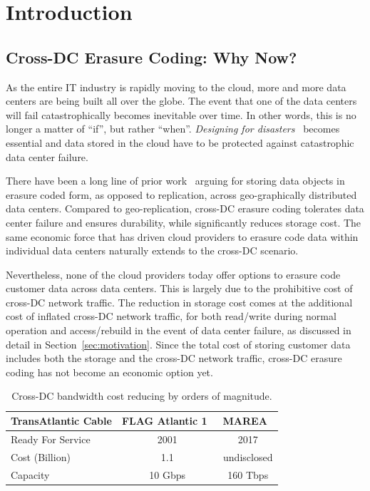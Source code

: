 \section{Introduction}

\subsection{Cross-DC Erasure Coding: Why Now?}

As the entire IT industry is rapidly moving to the cloud, more and more data
centers are being built all over the globe. The event that one of the data
centers will fail catastrophically becomes inevitable over time. In other words,
this is no longer a matter of ``if'', but rather ``when''. {\em Designing for
  disasters}~\cite{keeton04designing} becomes essential and data stored in the
cloud have to be protected against catastrophic data center failure.

There have been a long line of prior work~\cite{oceanstore:asplos00,
  pond:fast13, hail:ccs09, racs:socc10, hu12nccloud} arguing for storing data
objects in erasure coded form, as opposed to replication, across geo-graphically
distributed data centers. Compared to geo-replication, cross-DC erasure coding
tolerates data center failure and ensures durability, while significantly
reduces storage cost. The same economic force that has driven cloud providers to
erasure code data within individual data centers naturally extends to the
cross-DC scenario.

Nevertheless, none of the cloud providers today offer options to erasure code
customer data across data centers. This is largely due to the prohibitive cost
of cross-DC network traffic. The reduction in storage cost comes at the
additional cost of inflated cross-DC network traffic, for both read/write during
normal operation and access/rebuild in the event of data center failure, as
discussed in detail in Section~\ref{sec:motivation}. Since the total cost of
storing customer data includes both the storage and the cross-DC network
traffic, cross-DC erasure coding has not become an economic option yet.

\begin{table}[thp]
\centering
\small
\begin{tabular}{|l|c|c|}
\hline
TransAtlantic Cable             & FLAG Atlantic 1~\cite{bib:FA-1}   & MAREA~\cite{bib:MAREA1, bib:MAREA2}
\\ \hline \hline
Ready For Service               & 2001                              & 2017
\\ \hline
Cost (Billion)                  & 1.1                               & undisclosed
\\ \hline
Capacity                        & 10 Gbps                           & 160 Tbps
\\ \hline \hline
\end{tabular}
\caption{Cross-DC bandwidth cost reducing by orders of magnitude.}
\label{tab:mears}
\end{table}

